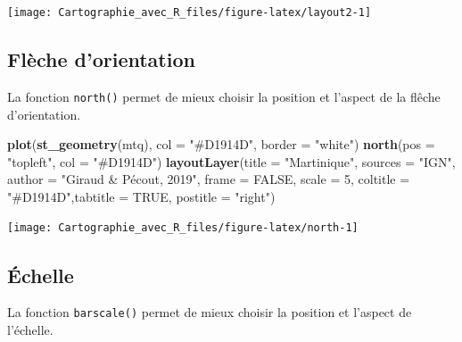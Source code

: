 \documentclass[]{book}
\newenvironment{Shaded}{\begin{snugshade}}{\end{snugshade}}
\newcommand{\KeywordTok}[1]{\textcolor[rgb]{0.13,0.29,0.53}{\textbf{#1}}}
\newcommand{\DataTypeTok}[1]{\textcolor[rgb]{0.13,0.29,0.53}{#1}}
\newcommand{\DecValTok}[1]{\textcolor[rgb]{0.00,0.00,0.81}{#1}}
\newcommand{\StringTok}[1]{\textcolor[rgb]{0.31,0.60,0.02}{#1}}
\newcommand{\OtherTok}[1]{\textcolor[rgb]{0.56,0.35,0.01}{#1}}
\newcommand{\NormalTok}[1]{#1}
\begin{document}
\begin{center}\texttt{[image: Cartographie\_avec\_R\_files/figure-latex/layout2-1]} \end{center}

\subsection{Flèche d'orientation}\label{fleche-dorientation}

La fonction \texttt{north()} permet de mieux choisir la position et
l'aspect de la flêche d'orientation.

\begin{Shaded}
\begin{Highlighting}[]
\KeywordTok{plot}\NormalTok{(}\KeywordTok{st_geometry}\NormalTok{(mtq), }\DataTypeTok{col =} \StringTok{"#D1914D"}\NormalTok{, }\DataTypeTok{border =} \StringTok{"white"}\NormalTok{)}
\KeywordTok{north}\NormalTok{(}\DataTypeTok{pos =} \StringTok{"topleft"}\NormalTok{, }\DataTypeTok{col =} \StringTok{"#D1914D"}\NormalTok{)}
\KeywordTok{layoutLayer}\NormalTok{(}\DataTypeTok{title =} \StringTok{"Martinique"}\NormalTok{, }\DataTypeTok{sources =} \StringTok{"IGN"}\NormalTok{, }
            \DataTypeTok{author =} \StringTok{"Giraud & Pécout, 2019"}\NormalTok{, }\DataTypeTok{frame =} \OtherTok{FALSE}\NormalTok{, }\DataTypeTok{scale =} \DecValTok{5}\NormalTok{,}
            \DataTypeTok{coltitle =} \StringTok{"#D1914D"}\NormalTok{,}\DataTypeTok{tabtitle =} \OtherTok{TRUE}\NormalTok{, }\DataTypeTok{postitle =} \StringTok{"right"}\NormalTok{)}
\end{Highlighting}
\end{Shaded}

\begin{center}\texttt{[image: Cartographie\_avec\_R\_files/figure-latex/north-1]} \end{center}

\subsection{Échelle}\label{echelle}

La fonction \texttt{barscale()} permet de mieux choisir la position et
l'aspect de l'échelle.
\end{document}

